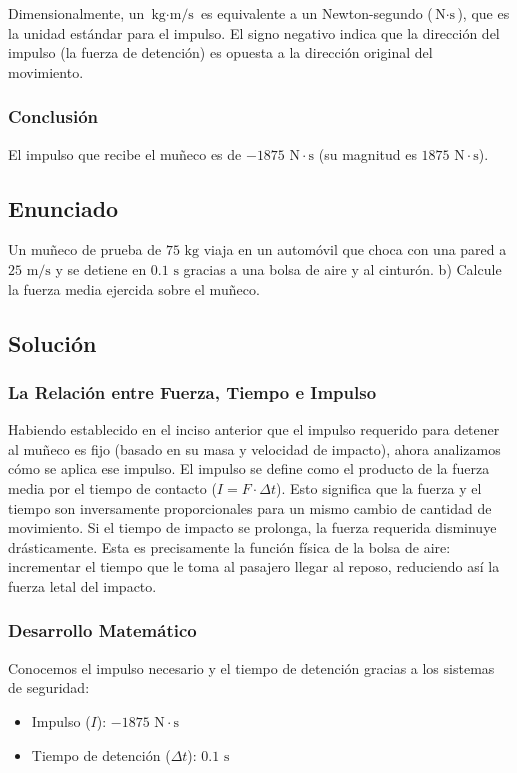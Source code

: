 \documentclass{article}
\begin{document}
Dimensionalmente, un $\text{kg}\cdot\text{m/s}$ es equivalente a un Newton-segundo ($\text{N}\cdot\text{s}$), que es la unidad estándar para el impulso. El signo negativo indica que la dirección del impulso (la fuerza de detención) es opuesta a la dirección original del movimiento.

\subsubsection*{Conclusión}
El impulso que recibe el muñeco es de $-1875 \text{ N}\cdot\text{s}$ (su magnitud es $1875 \text{ N}\cdot\text{s}$).

\newpage

\subsection*{Enunciado}
Un muñeco de prueba de $75 \text{ kg}$ viaja en un automóvil que choca con una pared a $25 \text{ m/s}$ y se detiene en $0.1 \text{ s}$ gracias a una bolsa de aire y al cinturón. 
b) Calcule la fuerza media ejercida sobre el muñeco.

\subsection*{Solución}

\subsubsection*{La Relación entre Fuerza, Tiempo e Impulso}
Habiendo establecido en el inciso anterior que el impulso requerido para detener al muñeco es fijo (basado en su masa y velocidad de impacto), ahora analizamos cómo se aplica ese impulso. El impulso se define como el producto de la fuerza media por el tiempo de contacto ($I = F \cdot \Delta t$). Esto significa que la fuerza y el tiempo son inversamente proporcionales para un mismo cambio de cantidad de movimiento. Si el tiempo de impacto se prolonga, la fuerza requerida disminuye drásticamente. Esta es precisamente la función física de la bolsa de aire: incrementar el tiempo que le toma al pasajero llegar al reposo, reduciendo así la fuerza letal del impacto.

\subsubsection*{Desarrollo Matemático}
Conocemos el impulso necesario y el tiempo de detención gracias a los sistemas de seguridad:
\begin{itemize}
    \item Impulso ($I$): $-1875 \text{ N}\cdot\text{s}$
    \item Tiempo de detención ($\Delta t$): $0.1 \text{ s}$
\end{itemize}
\end{document}
